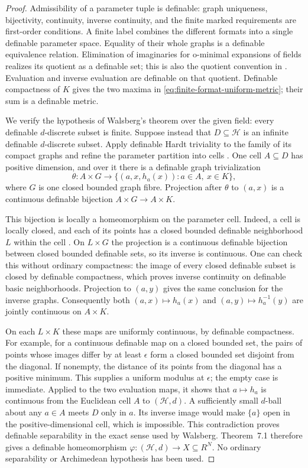 \begin{proof}
Admissibility of a parameter tuple is definable: graph uniqueness,
bijectivity, continuity, inverse continuity, and the finite marked
requirements are first-order conditions.  A finite label combines
the different formats into a single definable parameter space.
Equality of their whole graphs is a definable equivalence relation.
Elimination of imaginaries for o-minimal expansions of fields
realizes its quotient as a definable set; this is also the quotient
convention in \cite[p.~1]{Walsberg2015}.  Evaluation and inverse
evaluation are definable on that quotient.  Definable compactness
of $K$ gives the two maxima in
\eqref{eq:finite-format-uniform-metric}; their sum is a definable
metric.

We verify the hypothesis of Walsberg's theorem over the given
field: every definable $d$-discrete subset is finite.  Suppose
instead that $D\subseteq\mathcal H$ is an infinite definable
$d$-discrete subset.  Apply definable Hardt triviality to the
family of its compact graphs and refine the parameter partition
into cells \cite[Theorem~5.22, pp.~62--63]{Coste1999}.  One cell
$A\subseteq D$ has positive dimension, and over it there is a
definable graph trivialization
\[
 \theta:A\times G\longrightarrow
 \{(a,x,h_a(x)):a\in A,\ x\in K\},
\]
where $G$ is one closed bounded graph fibre.  Projection after
$\theta$ to $(a,x)$ is a continuous definable bijection
$A\times G\to A\times K$.

This bijection is locally a homeomorphism on the parameter cell.
Indeed, a cell is locally closed, and each of its points has a
closed bounded definable neighborhood $L$ within the cell
\cite[Proposition~3.7 and Exercise~3.8, pp.~27--28]{Coste1999}.
On $L\times G$ the projection is a continuous definable bijection
between closed bounded definable sets, so its inverse is continuous.
One can check this without ordinary compactness: the image of
every closed definable subset is closed by definable compactness,
which proves inverse continuity on definable basic neighborhoods.
Projection to $(a,y)$ gives the same conclusion for the inverse
graphs.  Consequently both $(a,x)\mapsto h_a(x)$ and
$(a,y)\mapsto h_a^{-1}(y)$ are jointly continuous on $A\times K$.

On each $L\times K$ these maps are uniformly continuous, by
definable compactness.  For example, for a continuous definable
map on a closed bounded set, the pairs of points whose images
differ by at least $\epsilon$ form a closed bounded set disjoint
from the diagonal.  If nonempty, the distance of its points from
the diagonal has a positive minimum.  This supplies a uniform
modulus at $\epsilon$; the empty case is immediate.  Applied to
the two evaluation maps, it shows that
$a\mapsto h_a$ is continuous from the Euclidean cell $A$ to
$(\mathcal H,d)$.  A sufficiently small $d$-ball about any $a\in A$
meets $D$ only in $a$.  Its inverse image would make $\{a\}$ open
in the positive-dimensional cell, which is impossible.  This
contradiction proves definable separability in the exact sense
used by Walsberg.  Theorem~7.1 therefore gives a definable
homeomorphism $\varphi:(\mathcal H,d)\to X\subseteq R^N$.
No ordinary separability or Archimedean hypothesis has been used.


\end{proof}
